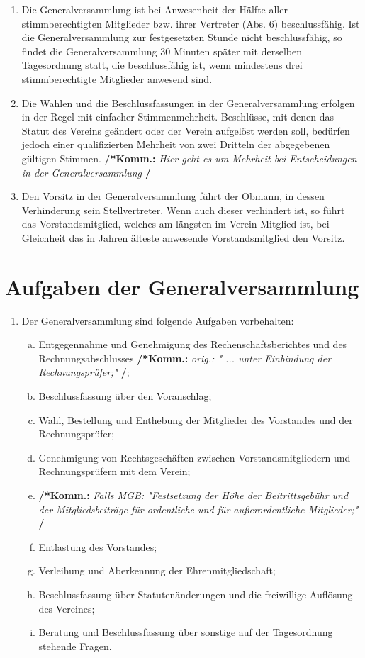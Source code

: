 \documentclass[a4paper,12pt]{article}
\newcommand{\comment}[1]{{\bf /*Komm.:} \textit{#1} {\bf */}}
\begin{document}
\begin{enumerate}
\item Die Generalversammlung ist bei Anwesenheit der Hälfte aller stimmberechtigten Mitglieder bzw. ihrer Vertreter (Abs. 6) beschlussfähig.
Ist die Generalversammlung zur festgesetzten Stunde nicht beschlussfähig, so findet die Generalversammlung 30 Minuten später mit derselben Tagesordnung statt,
die beschlussfähig ist, wenn mindestens drei stimmberechtigte Mitglieder anwesend sind.

\item Die Wahlen und die Beschlussfassungen in der Generalversammlung erfolgen in der Regel mit einfacher Stimmenmehrheit. Beschlüsse, mit denen das Statut des Vereins geändert oder der Verein aufgelöst werden soll, bedürfen jedoch einer qualifizierten Mehrheit von zwei Dritteln der abgegebenen gültigen Stimmen.
\comment{Hier geht es um Mehrheit bei Entscheidungen in der Generalversammlung}

\item Den Vorsitz in der Generalversammlung führt der Obmann, in dessen Verhinderung sein Stellvertreter. Wenn auch dieser verhindert ist, so führt das Vorstandsmitglied, welches am längsten im Verein Mitglied ist, bei Gleichheit das in Jahren älteste anwesende Vorstandsmitglied den Vorsitz.

\end{enumerate}

\section{Aufgaben der Generalversammlung} %
\begin{enumerate}
\item Der Generalversammlung sind folgende Aufgaben vorbehalten:
	\begin{enumerate}[(a)]
	\item Entgegennahme und Genehmigung des Rechenschaftsberichtes und des Rechnungsabschlusses \comment{orig.: " ... unter Einbindung der Rechnungsprüfer;"};
	\item Beschlussfassung über den Voranschlag;
	\item Wahl, Bestellung und Enthebung der Mitglieder des Vorstandes und der Rechnungsprüfer;
	\item Genehmigung von Rechtsgeschäften zwischen Vorstandsmitgliedern und Rechnungsprüfern mit dem Verein;
	\item \comment{Falls MGB: "Festsetzung der Höhe der Beitrittsgebühr und der Mitgliedsbeiträge für ordentliche und für außerordentliche Mitglieder;"}
	\item Entlastung des Vorstandes;
	\item Verleihung und Aberkennung der Ehrenmitgliedschaft;
	\item Beschlussfassung über Statutenänderungen und die freiwillige Auflösung des Vereines;
	\item Beratung und Beschlussfassung über sonstige auf der Tagesordnung stehende Fragen.
	\end{enumerate}
\end{enumerate}
\end{document}
